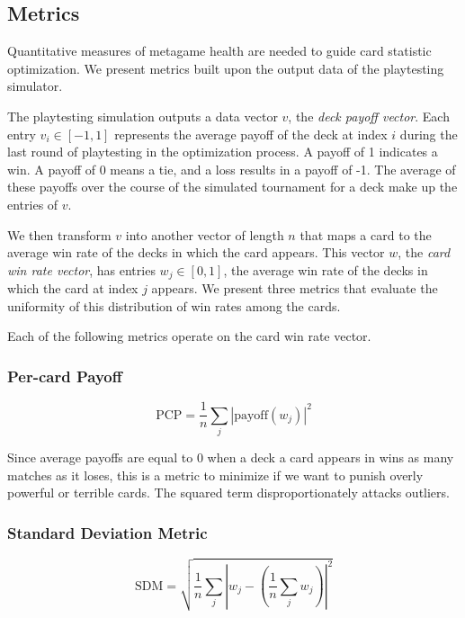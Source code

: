 \subsection{Metrics} \label{sec:metrics}

Quantitative measures of metagame health are needed to guide 
card statistic optimization. We present metrics built upon the
output data of the playtesting simulator.

The playtesting simulation outputs a data vector $v$, the \emph{deck payoff vector}.
Each entry $v_i \in [-1, 1]$ represents the average payoff of
the deck at index $i$ during the last round of playtesting in
the optimization process. A payoff of 1 indicates a win. A
payoff of 0 means a tie, and a loss results in a payoff of -1.
The average of these payoffs over the course of the simulated
tournament for a deck make up the entries of $v$.

We then transform $v$ into another vector of length $n$ that maps a card to the
average win rate of the decks in which the card appears. This
vector $w$, the \emph{card win rate vector}, has entries
$w_j \in [0, 1]$, the average win rate of the decks in which
the card at index $j$ appears. We present three metrics that 
evaluate the uniformity of 
this distribution of win rates among the cards.

Each of the following metrics operate on the card win rate vector.

\subsubsection{Per-card Payoff}

\begin{equation}
	\mathrm{PCP} = \frac{1}{n} \sum_j \left|\mathrm{payoff}(w_j)\right|^2
\end{equation}

Since average payoffs are equal to 0 when a deck a card appears in wins as many matches as it loses, this is a metric to 
minimize if we want to punish overly powerful or terrible cards. The squared term disproportionately attacks outliers.

\subsubsection{Standard Deviation Metric}

\begin{equation}
	\mathrm{SDM} = \sqrt{\frac{1}{n} \sum_j \left|w_j - \left(\frac{1}{n}\sum_j w_j\right)\right|^2}
\end{equation}

